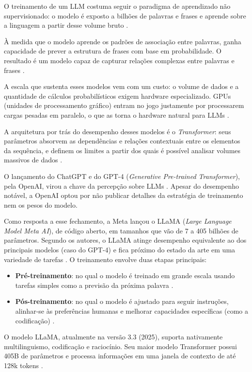 O treinamento de um LLM costuma seguir o paradigma de aprendizado não supervisionado: o modelo é exposto a bilhões de palavras e frases e aprende sobre a linguagem a partir desse volume bruto \cite{touvron2023}.

À medida que o modelo aprende os padrões de associação entre palavras, ganha capacidade de prever a estrutura de frases com base em probabilidade. O resultado é um modelo capaz de capturar relações complexas entre palavras e frases \cite{touvron2023}.

A escala que sustenta esses modelos vem com um custo: o volume de dados e a quantidade de cálculos probabilísticos exigem hardware especializado. GPUs (unidades de processamento gráfico) entram no jogo justamente por processarem cargas pesadas em paralelo, o que as torna o hardware natural para LLMs \cite{strubell2019}.

A arquitetura por trás do desempenho desses modelos é o \textit{Transformer}: seus parâmetros absorvem as dependências e relações contextuais entre os elementos da sequência, e definem os limites a partir dos quais é possível analisar volumes massivos de dados \cite{naveed2024}.

O lançamento do ChatGPT e do GPT-4 (\textit{Generative Pre-trained Transformer}), pela OpenAI, virou a chave da percepção sobre LLMs \cite{openai2024}. Apesar do desempenho notável, a OpenAI optou por não publicar detalhes da estratégia de treinamento nem os pesos do modelo.

Como resposta a esse fechamento, a Meta lançou o LLaMA (\textit{Large Language Model Meta AI}), de código aberto, em tamanhos que vão de 7 a 405 bilhões de parâmetros. Segundo os autores, o LLaMA atinge desempenho equivalente ao dos principais modelos (caso do GPT-4) e fica próximo do estado da arte em uma variedade de tarefas \cite{touvron2023}. O treinamento envolve duas etapas principais:

\begin{itemize}
    \item \textbf{Pré-treinamento}: no qual o modelo é treinado em grande escala usando tarefas simples como a previsão da próxima palavra \cite{llama3}.
    \item \textbf{Pós-treinamento}: no qual o modelo é ajustado para seguir instruções, alinhar-se às preferências humanas e melhorar capacidades específicas (como a codificação) \cite{llama3}.
\end{itemize}

O modelo LLaMA, atualmente na versão 3.3 (2025), suporta nativamente multilinguismo, codificação e raciocínio. Seu maior modelo Transformer possui 405B de parâmetros e processa informações em uma janela de contexto de até 128k tokens \cite{llama3}.

